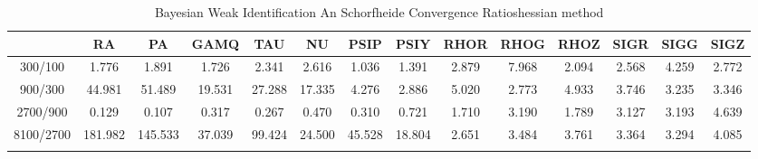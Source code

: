 \documentclass[a4paper,10pt]{article}
\begin{document}
\centering
\begin{longtable}{cccccccccccccc}
\toprule
 & RA & PA & GAMQ & TAU & NU & PSIP & PSIY & RHOR & RHOG & RHOZ & SIGR & SIGG & SIGZ \\
\midrule
300/100 & 1.776 & 1.891 & 1.726 & 2.341 & 2.616 & 1.036 & 1.391 & 2.879 & 7.968 & 2.094 & 2.568 & 4.259 & 2.772 \\
900/300 & 44.981 & 51.489 & 19.531 & 27.288 & 17.335 & 4.276 & 2.886 & 5.020 & 2.773 & 4.933 & 3.746 & 3.235 & 3.346 \\
2700/900 & 0.129 & 0.107 & 0.317 & 0.267 & 0.470 & 0.310 & 0.721 & 1.710 & 3.190 & 1.789 & 3.127 & 3.193 & 4.639 \\
8100/2700 & 181.982 & 145.533 & 37.039 & 99.424 & 24.500 & 45.528 & 18.804 & 2.651 & 3.484 & 3.761 & 3.364 & 3.294 & 4.085 \\
\bottomrule
\caption{Bayesian Weak Identification An Schorfheide Convergence Ratioshessian method}
\label{table:tbl:WeakAnSchoConvergenceRatios_hessian}
\end{longtable}
\end{document}
